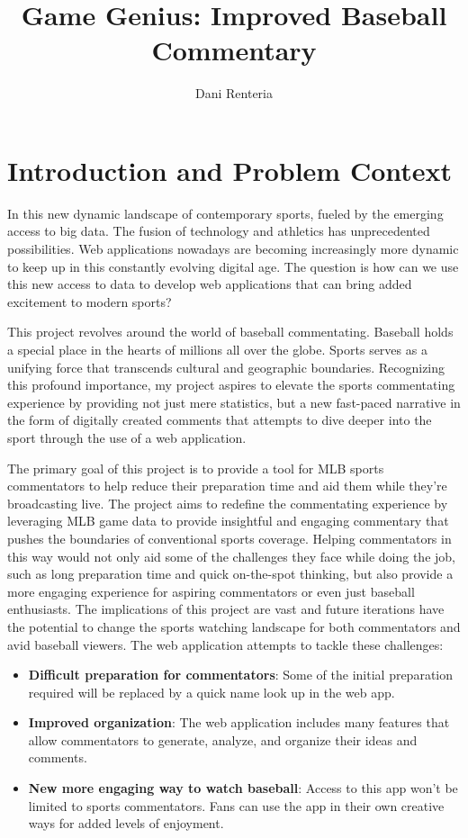 \documentclass[10pt,twocolumn]{article}
\title{Game Genius: Improved Baseball Commentary}
\author{Dani Renteria}
\affiliation{Occidental College}
\begin{document}
\maketitle

\section{Introduction and Problem Context}

In this new dynamic landscape of contemporary sports, fueled by the emerging access to big data. The fusion of technology and athletics has unprecedented possibilities. Web applications nowadays are becoming increasingly more dynamic to keep up in this constantly evolving digital age. The question is how can we use this new access to data to develop web applications that can bring added excitement to modern sports? 

This project revolves around the world of baseball commentating. Baseball holds a special place in the hearts of millions all over the globe. Sports serves as a unifying force that transcends cultural and geographic boundaries. Recognizing this profound importance, my project aspires to elevate the sports commentating experience by providing not just mere statistics, but a new fast-paced narrative in the form of digitally created comments that attempts to dive deeper into the sport through the use of a web application.

The primary goal of this project is to provide a tool for MLB sports commentators to help reduce their preparation time and aid them while they're broadcasting live. The project aims to redefine the commentating experience by leveraging MLB game data to provide insightful and engaging commentary that pushes the boundaries of conventional sports coverage. Helping commentators in this way would not only aid some of the challenges they face while doing the job, such as long preparation time and quick on-the-spot thinking, but also provide a more engaging experience for aspiring commentators or even just baseball enthusiasts. The implications of this project are vast and future iterations have the potential to change the sports watching landscape for both commentators and avid baseball viewers. 
\break\break
The web application attempts to tackle these challenges:
\begin{itemize}
    \item \textbf{Difficult preparation for commentators}: Some of the initial preparation required will be replaced by a quick name look up in the web app. 
    \item \textbf{Improved organization}: The web application includes many features that allow commentators to generate, analyze, and organize their ideas and comments. 
    \item \textbf{New more engaging way to watch baseball}: Access to this app won't be limited to sports commentators. Fans can use the app in their own creative ways for added levels of enjoyment. 
\end{itemize}
\end{document}
